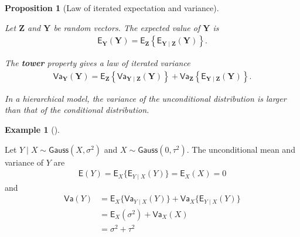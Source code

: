 \documentclass[
  11pt,
  letterpaper,
]{scrbook}
\theoremstyle{definition}
\theoremstyle{plain}
\newtheorem{proposition}{Proposition}[chapter]
\theoremstyle{plain}
\theoremstyle{definition}
\newtheorem{example}{Example}[chapter]
\theoremstyle{definition}
\theoremstyle{remark}
\begin{document}
\begin{proposition}[Law of iterated expectation and
variance]\protect\hypertarget{prp-iteratedexpectation}{}\label{prp-iteratedexpectation}

Let \(\boldsymbol{Z}\) and \(\boldsymbol{Y}\) be random vectors. The
expected value of \(\boldsymbol{Y}\) is \begin{align*}
\mathsf{E}_{\boldsymbol{Y}}(\boldsymbol{Y}) = \mathsf{E}_{\boldsymbol{Z}}\left\{\mathsf{E}_{\boldsymbol{Y} \mid \boldsymbol{Z}}(\boldsymbol{Y})\right\}.
\end{align*}

The \textbf{tower} property gives a law of iterated variance
\begin{align*}
\mathsf{Va}_{\boldsymbol{Y}}(\boldsymbol{Y}) = \mathsf{E}_{\boldsymbol{Z}}\left\{\mathsf{Va}_{\boldsymbol{Y} \mid \boldsymbol{Z}}(\boldsymbol{Y})\right\} + \mathsf{Va}_{\boldsymbol{Z}}\left\{\mathsf{E}_{\boldsymbol{Y} \mid \boldsymbol{Z}}(\boldsymbol{Y})\right\}.
\end{align*}

In a hierarchical model, the variance of the unconditional distribution
is larger than that of the conditional distribution.

\end{proposition}

\begin{example}[]\protect\hypertarget{exm-iteratedmean-gauss}{}\label{exm-iteratedmean-gauss}

Let \(Y \mid X\sim \mathsf{Gauss}(X, \sigma^2)\) and
\(X \sim \mathsf{Gauss}(0, \tau^2)\). The unconditional mean and
variance of \(Y\) are \begin{align*}
\mathsf{E}(Y) = \mathsf{E}_{X}\{\mathsf{E}_{Y\mid X}(Y)\}= \mathsf{E}_{X}(X) = 0
\end{align*} and \begin{align*}
\mathsf{Va}(Y) &= \mathsf{E}_{X}\{\mathsf{Va}_{Y\mid X}(Y)\} + \mathsf{Va}_{X}\{\mathsf{E}_{Y\mid X}(Y)\} \\&= \mathsf{E}_{X}(\sigma^2) + \mathsf{Va}_{X}(X)
\\&= \sigma^2 + \tau^2
\end{align*}

\end{example}
\end{document}
